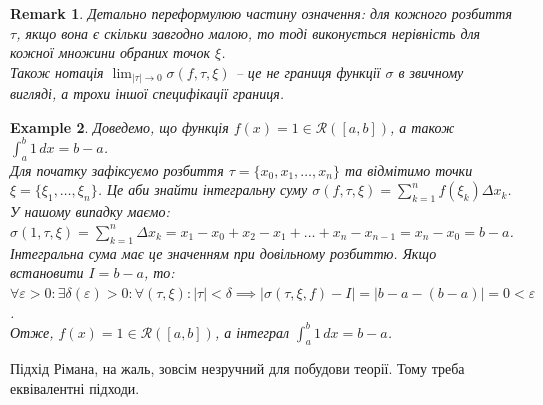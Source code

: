\documentclass[a4paper, 10pt]{article}
\def\huge{\displaystyle}
\theoremstyle{theoremdd}
\newtheorem{theorem}{Theorem}[subsection]
\theoremstyle{theoremdd}
\theoremstyle{theoremdd}
\theoremstyle{theoremdd}
\theoremstyle{theoremdd}
\newtheorem{example}[theorem]{Example}
\theoremstyle{theoremdd}
\theoremstyle{theoremdd}
\newtheorem{remark}[theorem]{Remark}
\theoremstyle{theoremdd}
\theoremstyle{theoremdd}
\begin{document}
\begin{remark}
Детально переформулюю частину означення: для кожного розбиття $\tau$, якщо вона є скільки завгодно малою, то тоді виконується нерівність для кожної множини обраних точок $\xi$.\\
Також нотація $\huge\lim_{|\tau| \to 0} \sigma(f,\tau,\xi)$ -- це не границя функції $\sigma$ в звичному вигляді, а трохи іншої специфікації границя.
\end{remark}

\begin{example}
Доведемо, що функція $f(x) = 1 \in \mathcal{R}([a,b])$, а також $\huge \int_a^b 1\,dx = b-a$.\\
Для початку зафіксуємо розбиття $\tau = \{x_0,x_1,\dots,x_n\}$ та відмітимо точки $\xi = \{\xi_1,\dots,\xi_n\}$. Це аби знайти інтегральну суму $\sigma (f, \tau, \xi) = \huge \sum_{k=1}^n f(\xi_k) \Delta x_k$. У нашому випадку маємо:\\
$\sigma (1, \tau, \xi) = \huge \sum_{k=1}^n \Delta x_k = x_1 - x_0 + x_2 - x_1 + \dots + x_n - x_{n-1} = x_n - x_0 = b - a$.\\
Інтегральна сума має це значенням при довільному розбиттю. Якщо встановити $I = b -a$, то:\\
$\forall \varepsilon > 0: \exists \delta(\varepsilon) > 0: \forall (\tau, \xi): |\tau| < \delta \implies |\sigma (\tau, \xi, f) - I| = |b-a - (b-a)| = 0 < \varepsilon$.\\
Отже, $f(x) = 1 \in \mathcal{R}([a,b])$, а інтеграл $\huge \int_a^b 1\,dx = b-a$.
\end{example}

\iffalse
\begin{theorem}
Задано функцію $f \colon [a,b] \to \mathbb{R}$.\\
Число $I$ -- інтеграл Рімана $\iff \forall (\tau_n, \xi_n): |\tau_n| \overset{n \to \infty}{\longrightarrow} 0 \implies \sigma(f, \tau_n, \xi_n) \overset{n \to \infty}{\longrightarrow} I$.\\
\textit{Зрозуміло. Фактично, це можна вважати як означення 'за Гайне', але не зовсім. Проте схожі.}
\end{theorem}
\fi

Підхід Рімана, на жаль, зовсім незручний для побудови теорії. Тому треба еквівалентні підходи.
\end{document}
